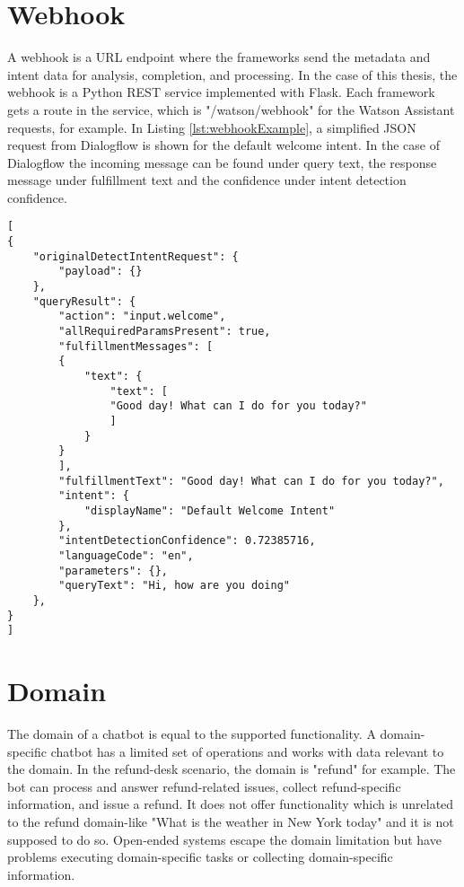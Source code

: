 \section{Webhook} \label{sec:webhook}
A webhook is a URL endpoint where the frameworks send the metadata and intent data for analysis, completion, and processing.
In the case of this thesis, the webhook is a Python REST service implemented with Flask.
Each framework gets a route in the service, which is "/watson/webhook" for the Watson Assistant requests, for example.
In Listing \ref{lst:webhookExample}, a simplified JSON request from Dialogflow is shown for the default welcome intent.
In the case of Dialogflow the incoming message can be found under query text, the response message under fulfillment text and the confidence under intent detection confidence. 
\begin{lstlisting}[caption={Dialogflow Webhook Request Example}, label={lst:webhookExample},captionpos=b,frame=single,language={[Sharp]C},commentstyle=\color{mygreen},keywordstyle=\color{blue},
morekeywords={}]                
[
{
    "originalDetectIntentRequest": {
        "payload": {}
    },
    "queryResult": {
        "action": "input.welcome",
        "allRequiredParamsPresent": true,
        "fulfillmentMessages": [
        {
            "text": {
                "text": [
                "Good day! What can I do for you today?"
                ]
            }
        }
        ],
        "fulfillmentText": "Good day! What can I do for you today?",
        "intent": {
            "displayName": "Default Welcome Intent"
        },
        "intentDetectionConfidence": 0.72385716,
        "languageCode": "en",
        "parameters": {},
        "queryText": "Hi, how are you doing"
    },
}
]\end{lstlisting}  


\section{Domain}
The domain of a chatbot is equal to the supported functionality.
A domain-specific chatbot has a limited set of operations and works with data relevant to the domain.
In the refund-desk scenario, the domain is "refund" for example.
The bot can process and answer refund-related issues, collect refund-specific information, and issue a refund. 
It does not offer functionality which is unrelated to the refund domain-like 
"What is the weather in New York today" and it is not supposed to do so.
Open-ended systems escape the domain limitation but have problems executing domain-specific tasks or collecting domain-specific information. 

